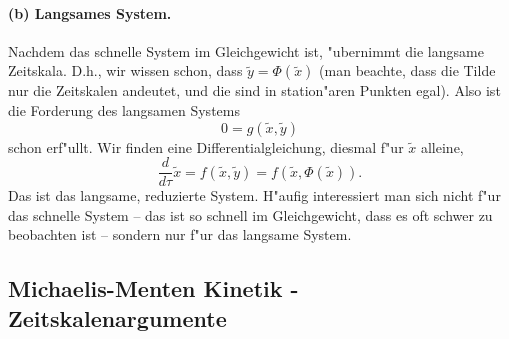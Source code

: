 \paragraph{\bf (b) Langsames System.} Nachdem das schnelle System im Gleichgewicht 
ist, "ubernimmt die langsame Zeitskala. D.h., wir wissen schon, dass 
$\tilde y=\Phi(\tilde x)$ (man beachte, dass die Tilde nur die Zeitskalen
andeutet, und die sind in station"aren Punkten egal). Also ist die Forderung des 
langsamen Systems
$$ 0=g(\tilde x,\tilde y)$$
schon erf"ullt. Wir finden eine Differentialgleichung, diesmal f"ur $\tilde x$ alleine,
$$ \frac d {d\tau}\tilde x = f(\tilde x, \tilde y) = f(\tilde x, \Phi(\tilde x)).$$
Das ist das langsame, reduzierte System.
H"aufig interessiert man sich nicht f"ur das schnelle System -- das ist so schnell im Gleichgewicht,
dass es oft schwer zu beobachten ist -- sondern nur f"ur das langsame System.

\subsection{ Michaelis-Menten Kinetik - Zeitskalenargumente}

